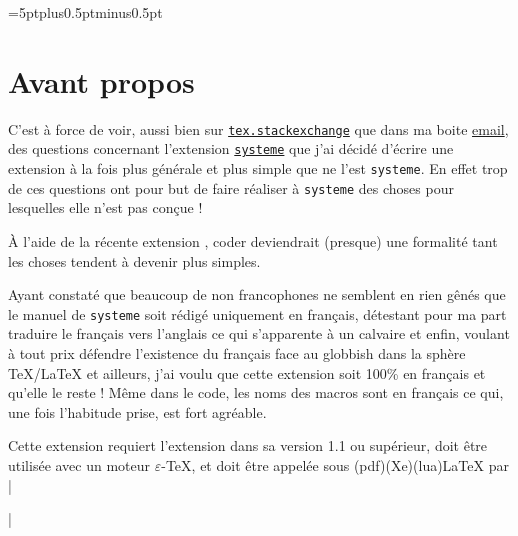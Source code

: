 \documentclass[frenchb,a4paper]{article}
\makeatletter
\def\eTeX{\hbox{$\varepsilon$-\TeX}}
\def\code{\expandafter\code@i\string}
\def\code@i#1{%
	\begingroup
	\par\nobreak\medskip\parindent0pt
	\leftskip.1\linewidth
	\defactive\^^I{\leavevmode\space\space\space\space}%
	\defactive\<{\begingroup$\langle$\itshape}%
	\defactive\>{$\rangle$\endgroup}%
	\let\do\@makeother \dospecials
	\ttfamily\small
	\obeylines\obeyspaces
	\def\code@ii##1#1{##1\par\medbreak\endgroup}%
	\code@ii
}
\def\longfraadate@i#1/#2/#3\@nil{\number#3\relax\space\ifcase #2 \or janvier\or février\or mars\or avril\or mai\or juin\or juillet\or aout\or septembre\or octobre\or novembre\or décembre\fi\space#1}
\edef\longfraadate{\expandafter\longfraadate@i\aadate\@nil}
\makeatother
\begin{document}
\parindent=0pt
\thispagestyle{empty}
\parskip=5ptplus0.5ptminus0.5pt\relax
\def\listofitems{\textsf\loiname}
\def\aa{\textsf\aanom}
\section{Avant propos}
C'est à force de voir, aussi bien sur \href{http://tex.stackexchange.com/}{\texttt{tex.stackexchange}} que dans ma boite \href{mailto:unbonpetit@openmailbox.org}{email}, des questions concernant l'extension \href{https://www.ctan.org/pkg/systeme}{\texttt{systeme}} que j'ai décidé d'écrire une extension à la fois plus générale et plus simple que ne l'est \texttt{systeme}. En effet trop de ces questions ont pour but de faire réaliser à \texttt{systeme} des choses pour lesquelles elle n'est pas conçue !

À l'aide de la récente extension \href{https://www.ctan.org/pkg/listofitems}{\listofitems}, coder \aa{} deviendrait (presque) une formalité tant les choses tendent à devenir plus simples.

Ayant constaté que beaucoup de non francophones ne semblent en rien gênés que le manuel de \texttt{systeme} soit rédigé uniquement en français, détestant pour ma part traduire le français vers l'anglais ce qui s'apparente à un calvaire et enfin, voulant à tout prix défendre l'existence du français face au globbish dans la sphère \TeX/\LaTeX{} et ailleurs, j'ai voulu que cette extension soit 100\% en français et qu'elle le reste ! Même dans le code, les noms des macros sont en français ce qui, une fois l'habitude prise, est fort agréable.
\bigbreak

Cette extension requiert l'extension \listofitems{} dans sa version 1.1 ou supérieur, doit être utilisée avec un moteur \eTeX, et doit être appelée sous (pdf)(Xe)(lua)\LaTeX{} par
\code|\usepackage{autoaligne}|
\end{document}
